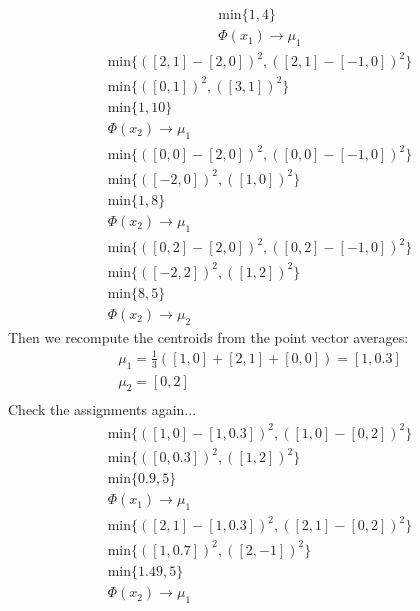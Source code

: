 \documentclass[12pt]{article}
\begin{document}
\begin{enumerate}[label=(\alph*)]
\begin{gather*}
				\text{min} \{ 1, 4\} \\
				\Phi(x_1) \rightarrow \mu_1
			\end{gather*}
			\begin{gather*}
				\text{min} \{ ( [2,1] - [2, 0] )^2, ( [2,1] - [-1, 0] )^2\} \\
				\text{min} \{ ( [0,1] )^2, ( [3, 1] )^2\} \\
				\text{min} \{ 1, 10\} \\
				\Phi(x_2) \rightarrow \mu_1
			\end{gather*}
			\begin{gather*}
				\text{min} \{ ( [0,0] - [2, 0] )^2, ( [0,0] - [-1, 0] )^2\} \\
				\text{min} \{ ( [-2,0] )^2, ( [1, 0] )^2\} \\
				\text{min} \{ 1, 8\} \\
				\Phi(x_2) \rightarrow \mu_1
			\end{gather*}
			\begin{gather*}
				\text{min} \{ ( [0,2] - [2, 0] )^2, ( [0,2] - [-1, 0] )^2\} \\
				\text{min} \{ ( [-2,2] )^2, ( [1, 2] )^2\} \\
				\text{min} \{ 8, 5\} \\
				\Phi(x_2) \rightarrow \mu_2
			\end{gather*}
			Then we recompute the centroids from the point vector averages:
			\begin{gather*}
				\mu_1 = \frac{1}{3} ( [1,0] + [2, 1] + [0, 0] ) =  [1, 0.3] \\
				\mu_2 = [0, 2] \\
			\end{gather*}
			Check the assignments again...
			\begin{gather*}
				\text{min} \{ ( [1,0] - [1, 0.3] )^2, ( [1,0] - [0, 2] )^2\} \\
				\text{min} \{ ( [0,0.3] )^2, ( [1, 2] )^2\} \\
				\text{min} \{ 0.9, 5\} \\
				\Phi(x_1) \rightarrow \mu_1
			\end{gather*}
			\begin{gather*}
				\text{min} \{ ( [2,1] - [1, 0.3] )^2, ( [2,1] - [0, 2] )^2\} \\
				\text{min} \{ ( [1,0.7] )^2, ( [2, -1] )^2\} \\
				\text{min} \{ 1.49, 5\} \\
				\Phi(x_2) \rightarrow \mu_1
			\end{gather*}

\end{enumerate}
\end{document}
